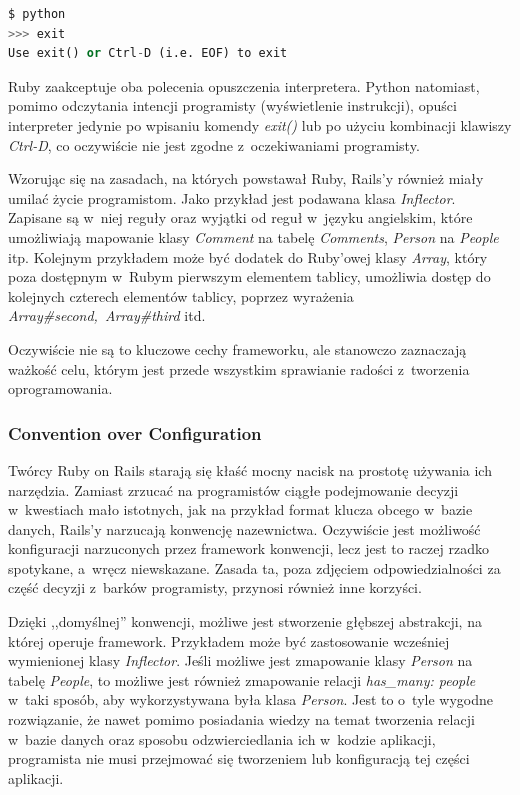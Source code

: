 \begin{lstlisting}[caption={Wyjście z~interpretera Python'a.},language=Python]
$ python
>>> exit
Use exit() or Ctrl-D (i.e. EOF) to exit
\end{lstlisting}
Ruby zaakceptuje oba polecenia opuszczenia interpretera. Python natomiast, pomimo odczytania intencji programisty (wyświetlenie instrukcji), opuści interpreter jedynie po wpisaniu komendy \emph{exit()} lub po użyciu kombinacji klawiszy \emph{Ctrl-D}, co oczywiście nie jest zgodne z~oczekiwaniami programisty.

Wzorując się na zasadach, na których powstawał Ruby, Rails'y również miały umilać życie programistom. Jako przykład jest podawana klasa \emph{Inflector}. Zapisane są w~niej reguły oraz wyjątki od reguł w~języku angielskim, które umożliwiają mapowanie klasy \emph{Comment} na tabelę \emph{Comments}, \emph{Person} na \emph{People} itp. Kolejnym przykładem może być dodatek do Ruby'owej klasy \emph{Array}, który poza dostępnym w~Rubym pierwszym elementem tablicy, umożliwia dostęp do kolejnych czterech elementów tablicy, poprzez wyrażenia \emph{Array\#second,~Array\#third} itd.

Oczywiście nie są to kluczowe cechy frameworku, ale stanowczo zaznaczają ważkość celu, którym jest przede wszystkim sprawianie radości z~tworzenia oprogramowania.

\subsubsection{Convention over Configuration}
Twórcy Ruby on Rails starają się kłaść mocny nacisk na prostotę używania ich narzędzia. Zamiast zrzucać na programistów ciągłe podejmowanie decyzji w~kwestiach mało istotnych, jak na przykład format klucza obcego w~bazie danych, Rails'y narzucają konwencję nazewnictwa. Oczywiście jest możliwość konfiguracji narzuconych przez framework konwencji, lecz jest to raczej rzadko spotykane, a~wręcz niewskazane. Zasada ta, poza zdjęciem odpowiedzialności za część decyzji z~barków programisty, przynosi również inne korzyści.

Dzięki ,,domyślnej'' konwencji, możliwe jest stworzenie głębszej abstrakcji, na której operuje framework. Przykładem może być zastosowanie wcześniej wymienionej klasy \emph{Inflector}. Jeśli możliwe jest zmapowanie klasy \emph{Person} na tabelę \emph{People}, to możliwe jest również zmapowanie relacji \emph{has\_many: people} w~taki sposób, aby wykorzystywana była klasa \textit{Person}. Jest to o~tyle wygodne rozwiązanie, że nawet pomimo posiadania wiedzy na temat tworzenia relacji w~bazie danych oraz sposobu odzwierciedlania ich w~kodzie aplikacji, programista nie musi przejmować się tworzeniem lub konfiguracją tej części aplikacji.

